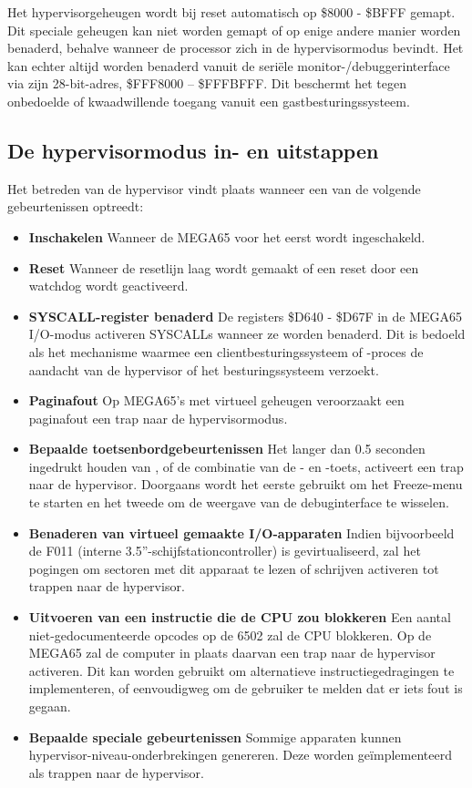 Het hypervisorgeheugen wordt bij reset automatisch op \$8000 - \$BFFF gemapt. Dit speciale geheugen kan niet worden gemapt of op enige andere manier worden benaderd, behalve wanneer de processor zich in de hypervisormodus bevindt. Het kan echter altijd worden benaderd vanuit de seriële monitor-/debuggerinterface via zijn 28-bit-adres, \$FFF8000 -- \$FFFBFFF. Dit beschermt het tegen onbedoelde of kwaadwillende toegang vanuit een gastbesturingssysteem.

\subsection{De hypervisormodus in- en uitstappen}

Het betreden van de hypervisor vindt plaats wanneer een van de volgende gebeurtenissen optreedt:

\begin{itemize}
\item{\bf Inschakelen} Wanneer de MEGA65 voor het eerst wordt ingeschakeld.\item{\bf Reset} Wanneer de resetlijn laag wordt gemaakt of een reset door een watchdog wordt geactiveerd.\item{\bf SYSCALL-register benaderd} De registers \$D640 - \$D67F in de MEGA65 I/O-modus activeren SYSCALLs wanneer ze worden benaderd. Dit is bedoeld als het mechanisme waarmee een clientbesturingssysteem of -proces de aandacht van de hypervisor of het besturingssysteem verzoekt.\item{\bf Paginafout} Op MEGA65's met virtueel geheugen veroorzaakt een paginafout een trap naar de hypervisormodus.\item{\bf Bepaalde toetsenbordgebeurtenissen} Het langer dan 0.5 seconden ingedrukt houden van , of de combinatie van de \megasymbolkey- en -toets, activeert een trap naar de hypervisor. Doorgaans wordt het eerste gebruikt om het Freeze-menu te starten en het tweede om de weergave van de debuginterface te wisselen.\item{\bf Benaderen van virtueel gemaakte I/O-apparaten} Indien bijvoorbeeld de F011 (interne 3.5''-schijfstationcontroller) is gevirtualiseerd, zal het pogingen om sectoren met dit apparaat te lezen of schrijven activeren tot trappen naar de hypervisor. \item{\bf Uitvoeren van een instructie die de CPU zou blokkeren} Een aantal niet-gedocumenteerde opcodes op de 6502 zal de CPU blokkeren. Op de MEGA65 zal de computer in plaats daarvan een trap naar de hypervisor activeren. Dit kan worden gebruikt om alternatieve instructiegedragingen te implementeren, of eenvoudigweg om de gebruiker te melden dat er iets fout is gegaan. \item{\bf Bepaalde speciale gebeurtenissen} Sommige apparaten kunnen hypervisor-niveau-onderbrekingen genereren. Deze worden geïmplementeerd als trappen naar de hypervisor.
\end{itemize}

